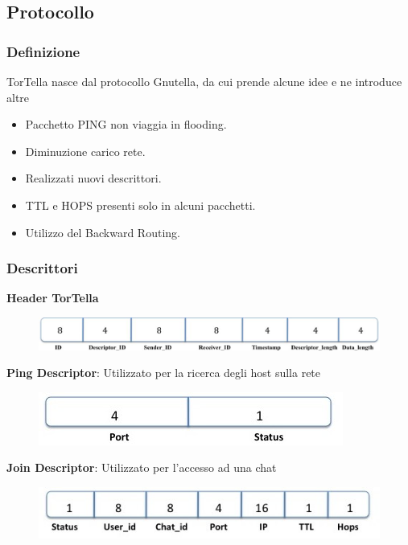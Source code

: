 \documentclass[a4paper,italian,12pt]{beamer}
\begin{document}
    	\subsection{Protocollo}
    		\begin{frame}
    			\frametitle{Definizione}
   				\begin{beamerboxesrounded}[upper=palette primary,lower=palette primary,shadow=true]{ }
    				TorTella nasce dal protocollo Gnutella, da cui prende alcune idee e ne introduce altre
    			\end{beamerboxesrounded}
				\vspace{10mm}
    			\begin{itemize}
    				\item Pacchetto PING non viaggia in flooding.
    				\item Diminuzione carico rete.
    				\item Realizzati nuovi descrittori.
    				\item TTL e HOPS presenti solo in alcuni pacchetti.
    				\item Utilizzo del Backward Routing.
    			\end{itemize}
    		\end{frame}
    		\begin{frame}
    			\frametitle{Descrittori}	
	    			\textbf{Header TorTella}
    				\begin{figure}[H]
						\includegraphics[scale=0.15]{etc/tortellaheader.jpg}
					\end{figure}
					\textbf{Ping Descriptor}: Utilizzato per la ricerca degli host sulla rete
    				\begin{figure}[H]
						\includegraphics[scale=0.3]{etc/ping.jpg}
					\end{figure}
					\textbf{Join Descriptor}: Utilizzato per l'accesso ad una chat
    				\begin{figure}[H]
						\includegraphics[scale=0.3]{etc/join.jpg}
					\end{figure}
    		\end{frame}
\end{document}
